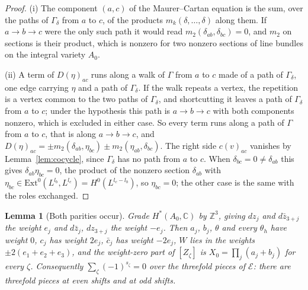 \documentclass[11pt,reqno]{amsart}
\numberwithin{equation}{section}
\theoremstyle{plain}
\newtheorem{lemma}[theorem]{Lemma}
\theoremstyle{definition}
\newcommand{\ZZ}{\mathbb{Z}}
\newcommand{\CC}{\mathbb{C}}
\newcommand{\Ext}{\mathrm{Ext}}
\begin{document}
\begin{proof}
(i) The component $(a,c)$ of the Maurer--Cartan equation is the sum, over the paths of $\Gamma_{\delta}$ from $a$ to $c$, of the products $m_{k}(\delta,\dots,\delta)$ along them. If $a\to b\to c$ were the only such path it would read $m_{2}(\delta_{ab},\delta_{bc})=0$, and $m_{2}$ on sections is their product, which is nonzero for two nonzero sections of line bundles on the integral variety $A_{0}$.

(ii) A term of $D(\eta)_{ac}$ runs along a walk of $\Gamma$ from $a$ to $c$ made of a path of $\Gamma_{\delta}$, one edge carrying $\eta$ and a path of $\Gamma_{\delta}$. If the walk repeats a vertex, the repetition is a vertex common to the two paths of $\Gamma_{\delta}$, and shortcutting it leaves a path of $\Gamma_{\delta}$ from $a$ to $c$; under the hypothesis this path is $a\to b\to c$ with both components nonzero, which is excluded in either case. So every term runs along a path of $\Gamma$ from $a$ to $c$, that is along $a\to b\to c$, and $D(\eta)_{ac}=\pm m_{2}(\delta_{ab},\eta_{bc})\pm m_{2}(\eta_{ab},\delta_{bc})$. The right side $c(v)_{ac}$ vanishes by Lemma~\ref{lem:cocycle}, since $\Gamma_{\delta}$ has no path from $a$ to $c$. When $\delta_{bc}=0\ne\delta_{ab}$ this gives $\delta_{ab}\eta_{bc}=0$, the product of the nonzero section $\delta_{ab}$ with $\eta_{bc}\in\Ext^{0}(L^{l_{b}},L^{l_{c}})=H^{0}(L^{l_{c}-l_{b}})$, so $\eta_{bc}=0$; the other case is the same with the roles exchanged.
\end{proof}

\begin{lemma}[Both parities occur]\label{lem:parity}
Grade $H^{*}(A_{0},\CC)$ by $\ZZ^{3}$, giving $dz_{j}$ and $d\bar z_{3+j}$ the weight $e_{j}$ and $d\bar z_{j}$, $dz_{3+j}$ the weight $-e_{j}$. Then $a_{j}$, $b_{j}$, $\theta$ and every $\theta_{h}$ have weight $0$, $c_{j}$ has weight $2e_{j}$, $\bar c_{j}$ has weight $-2e_{j}$, $W$ lies in the weights $\pm2(e_{1}+e_{2}+e_{3})$, and the weight-zero part of $[Z_{\zeta}]$ is $X_{0}=\prod_{j}(a_{j}+b_{j})$ for every $\zeta$. Consequently $\sum_{\zeta}(-1)^{s_{\zeta}}=0$ over the threefold pieces of $\mathcal{E}$: there are threefold pieces at even shifts and at odd shifts.
\end{lemma}
\end{document}
